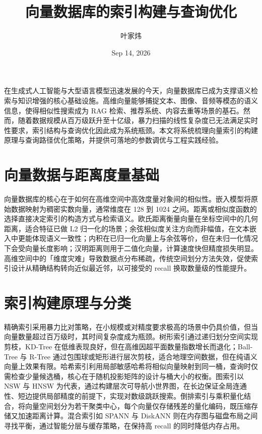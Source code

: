 \title{向量数据库的索引构建与查询优化}
\author{叶家炜}
\date{Sep 14, 2026}
\maketitle
在生成式人工智能与大型语言模型迅速发展的今天，向量数据库已成为支撑语义检索与知识增强的核心基础设施。高维向量能够捕捉文本、图像、音频等模态的语义信息，使得相似性搜索成为 RAG 检索、推荐系统、内容去重等场景的基石。然而，随着数据规模从百万级跃升至十亿级，暴力扫描的线性复杂度已无法满足实时性要求，索引结构与查询优化因此成为系统瓶颈。本文将系统梳理向量索引的构建原理与查询路径优化策略，并提供可落地的参数调优与工程实践经验。\par
\chapter{向量数据与距离度量基础}
向量数据库的核心在于如何在高维空间中高效度量对象间的相似性。嵌入模型将原始数据映射为稠密实数向量，通常维度在 128 到 1024 之间。距离或相似度函数的选择直接决定索引的构造方式与检索语义。欧氏距离衡量向量在坐标空间中的几何距离，适合特征已做 L2 归一化的场景；余弦相似度关注方向而非幅值，在文本嵌入中更能体现语义一致性；内积在已归一化向量上与余弦等价，但在未归一化情况下会受向量长度影响；汉明距离则用于二值化向量，计算速度快但精度损失明显。高维空间中的「维度灾难」导致数据点分布稀疏，传统空间划分方法失效，促使索引设计从精确结构转向近似最近邻，以可接受的 recall 换取数量级的性能提升。\par
\chapter{索引构建原理与分类}
精确索引采用暴力比对策略，在小规模或对精度要求极高的场景中仍具价值，但当向量数量超过百万级时，其时间复杂度成为瓶颈。树形索引通过递归划分空间实现剪枝，KD-Tree 在低维表现良好，但在高维因超平面数量指数增长而退化；Ball-Tree 与 R-Tree 通过包围球或矩形进行层次剪枝，适合地理空间数据，但在纯语义向量上效果有限。哈希索引利用局部敏感哈希将相似向量映射到同一桶，查询时仅需检查少量候选桶，核心在于随机投影矩阵的设计与桶大小的权衡。图索引以 NSW 与 HNSW 为代表，通过构建层次可导航小世界图，在长边保证全局连通性、短边提供局部精度的前提下，实现对数级跳跃搜索。倒排索引与乘积量化结合，将向量空间划分为若干聚类中心，每个向量仅存储残差的量化编码，既压缩存储又加速距离计算。混合索引如 SPANN 与 DiskANN 则在内存图与磁盘布局之间寻找平衡，通过智能分层与缓存策略，在保持高 recall 的同时降低内存占用。\par
